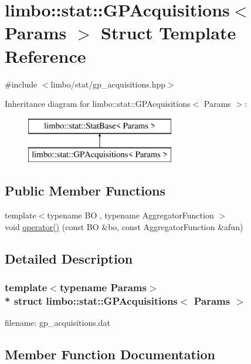 \hypertarget{structlimbo_1_1stat_1_1_g_p_acquisitions}{}\section{limbo\+:\+:stat\+:\+:G\+P\+Acquisitions$<$ Params $>$ Struct Template Reference}
\label{structlimbo_1_1stat_1_1_g_p_acquisitions}


{\ttfamily \#include $<$limbo/stat/gp\+\_\+acquisitions.\+hpp$>$}

Inheritance diagram for limbo\+:\+:stat\+:\+:G\+P\+Acquisitions$<$ Params $>$\+:\begin{figure}[H]
\begin{center}
\leavevmode
\includegraphics[height=2.000000cm]{structlimbo_1_1stat_1_1_g_p_acquisitions}
\end{center}
\end{figure}
\subsection*{Public Member Functions}
\begin{DoxyCompactItemize}
\item 
{\footnotesize template$<$typename BO , typename Aggregator\+Function $>$ }\\void \hyperlink{structlimbo_1_1stat_1_1_g_p_acquisitions_ac671f5f138d1545bd339068ec5fe4824}{operator()} (const BO \&bo, const Aggregator\+Function \&afun)
\end{DoxyCompactItemize}


\subsection{Detailed Description}
\subsubsection*{template$<$typename Params$>$\\*
struct limbo\+::stat\+::\+G\+P\+Acquisitions$<$ Params $>$}

filename\+: {\ttfamily gp\+\_\+acquisitions.\+dat} 

\subsection{Member Function Documentation}
